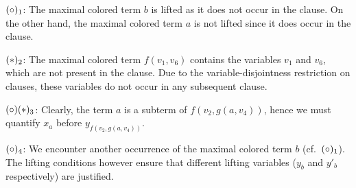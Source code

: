 \begin{exa}
\begin{landscape}
\begin{center}
\begin{adjustwidth}{-4cm}{}
\begin{prooftree}

				\insertBetweenHyps{\hskip -2cm}
				\noLine

			\end{prooftree}
		\end{adjustwidth}
		\end{center}
		\medskip

		\begin{adjustwidth}{-1cm}{}
		\begin{multicols}{2}
			$(\circ)_1$: The maximal colored term $b$ is lifted as it does not occur in the clause. On the other hand, the maximal colored term $a$ is not lifted since it does occur in the clause.

		$(*)_2$: The maximal colored term $f(v_1, v_6)$ contains the variables $v_1$ and $v_6$, which are not present in the clause.
		Due to the variable-disjointness restriction on clauses, these variables do not occur in any subsequent clause.

		$(\circ)(*)_3$: Clearly, the term $a$ is a subterm of $f(v_2, g(a, v_4))$, hence we must quantify $x_a$ before $y_{f(v_2, g(a, v_4))}$.

		$(\circ)_4$: We encounter another occurrence of the maximal colored term $b$ (cf.\ $(\circ)_1$).
		The lifting conditions however ensure that different lifting variables ($y_b$ and $y'_b$ respectively) are justified.
		\qedhere
	\end{multicols}
		\end{adjustwidth}

		\vspace*{\fill}
	\end{landscape}
\end{exa}
